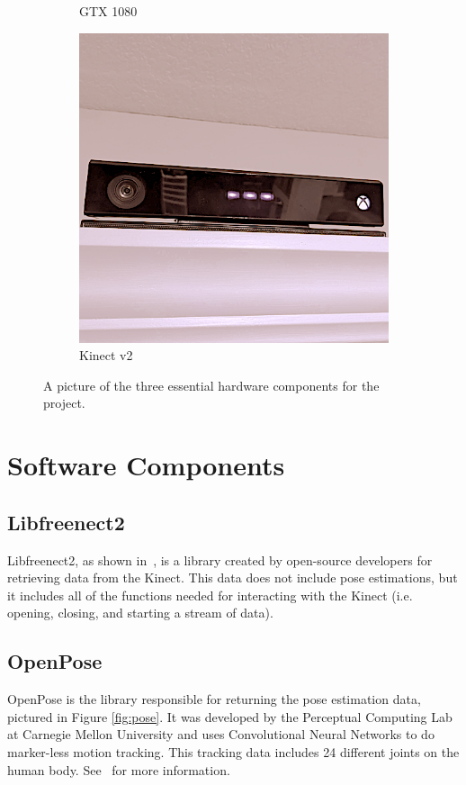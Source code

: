 \documentclass{article}
\begin{document}
\begin{figure}[t!]
\begin{subfigure}[t]{0.32\columnwidth}
    \caption{GTX 1080\label{subfig:gpu}}
\end{subfigure}
\begin{subfigure}[t]{0.32\columnwidth}
    \centering
    \includegraphics[width=1\textwidth]{Kinect.png}
    \caption{Kinect v2\label{subfig:kinect}}
\end{subfigure}
\caption{A picture of the three essential hardware components for the project.\label{fig:hardware}}
\end{figure}

\section{Software Components}\label{sec:components}
\subsection{Libfreenect2}\label{subsec:libfreenect2}
Libfreenect2, as shown in~\cite{lingzhu_xiang_libfreenect2_2016}, is a library created by open-source developers for retrieving data from the Kinect. This data does not include pose estimations, but it includes all of the functions needed for interacting with the Kinect (i.e. opening, closing, and starting a stream of data).
\subsection{OpenPose}\label{subsec:openpose}
OpenPose is the library responsible for returning the pose estimation data, pictured in Figure \ref{fig:pose}. It was developed by the Perceptual Computing Lab at Carnegie Mellon University and uses Convolutional Neural Networks to do marker-less motion tracking. This tracking data includes 24 different joints on the human body. See~\cite{8765346, simon2017hand, cao2017realtime, wei2016cpm} for more information.
\end{document}
